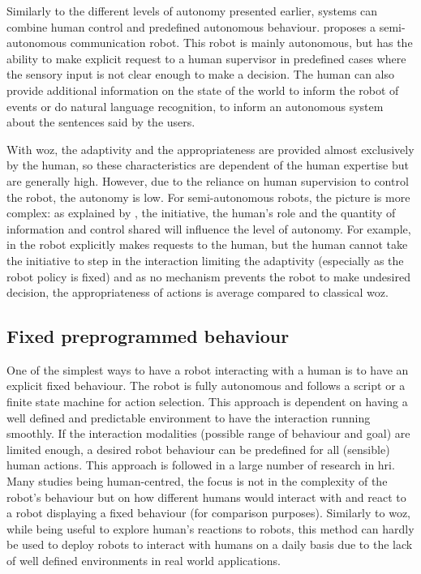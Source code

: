 	Similarly to the different levels of autonomy presented earlier, systems can combine human control and predefined autonomous behaviour. \citet{shiomi2008semi} proposes a semi-autonomous communication robot. This robot is mainly autonomous, but has the ability to make explicit request to a human supervisor in predefined cases where the sensory input is not clear enough to make a decision. The human can also provide additional information on the state of the world to inform the robot of events or do natural language recognition, to inform an autonomous system about the sentences said by the users. %
 
	With \gls{woz}, the adaptivity and the appropriateness are provided almost exclusively by the human, so these characteristics are dependent of the human expertise but are generally high. However, due to the reliance on human supervision to control the robot, the autonomy is low. For semi-autonomous robots, the picture is more complex: as explained by \cite{beer2014toward}, the initiative, the human's role and the quantity of information and control shared will influence the level of autonomy. For example, in \citet{shiomi2008semi} the robot explicitly makes requests to the human, but the human cannot take the initiative to step in the interaction limiting the adaptivity (especially as the robot policy is fixed) and as no mechanism prevents the robot to make undesired decision, the appropriateness of actions is average compared to classical \gls{woz}.
	
\subsection{Fixed preprogrammed behaviour}

    One of the simplest ways to have a robot interacting with a human is to have an explicit fixed behaviour. The robot is fully autonomous and follows a script or a finite state machine for action selection. This approach is dependent on having a well defined and predictable environment to have the interaction running smoothly. If the interaction modalities (possible range of behaviour and goal) are limited enough, a desired robot behaviour can be predefined for all (sensible) human actions. This approach is followed in a large number of research in \gls{hri}. Many studies being human-centred, the focus is not in the complexity of the robot's behaviour but on how different humans would interact with and react to a robot displaying a fixed behaviour (for comparison purposes). Similarly to \gls{woz}, while being useful to explore human's reactions to robots, this method can hardly be used to deploy robots to interact with humans on a daily basis due to the lack of well defined environments in real world applications.

